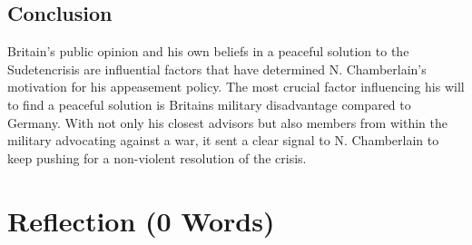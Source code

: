 \documentclass[10pt, a4papert, hidelinks]{article}
\begin{document}
\subsection{Conclusion}


Britain's public opinion and his own beliefs in a peaceful solution to the Sudetencrisis are influential factors that have determined N. Chamberlain's motivation for his appeasement policy. The most crucial factor influencing his will to find a peaceful solution is Britains military disadvantage compared to Germany. With not only his closest advisors but also members from within the military advocating against a war, it sent a clear signal to N. Chamberlain to keep pushing for a non-violent resolution of the crisis.

\section{Reflection (0 Words)}


\end{document}
